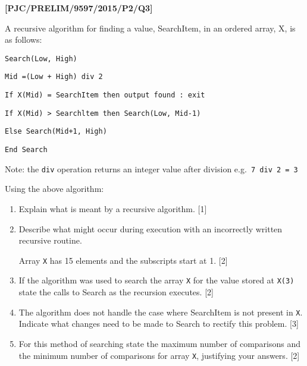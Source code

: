\item \textbf{{[}PJC/PRELIM/9597/2015/P2/Q3{]} }

A recursive algorithm for finding a value, SearchItem, in an ordered
array, X, is as follows: 

\noindent %
\noindent\begin{minipage}[t]{1\columnwidth}%
\texttt{Search(Low, High) }

\texttt{\qquad{}Mid =(Low + High) div 2 }

\texttt{\qquad{}If X(Mid) = SearchItem then output \textquotedbl found\textquotedbl{}
: exit }

\texttt{\qquad{}If X(Mid) > Searchltem then Search(Low, Mid-1) }

\texttt{\qquad{}\qquad{}Else Search(Mid+1, High) }

\texttt{End Search }

\texttt{\qquad{}}Note: the \texttt{div} operation returns an integer
value after division e.g.\texttt{ 7 div 2 = 3} %
\end{minipage}

Using the above algorithm: 
\begin{enumerate}
\item Explain what is meant by a recursive algorithm. \hfill{}{[}1{]}
\item Describe what might occur during execution with an incorrectly written
recursive routine. 

Array \texttt{X} has 15 elements and the subscripts start at 1. \hfill{}
{[}2{]}
\item If the algorithm was used to search the array \texttt{X} for the value
stored at \texttt{X(3)} state the calls to Search as the recursion
executes. \hfill{} {[}2{]}
\item The algorithm does not handle the case where SearchItem is not present
in \texttt{X}. Indicate what changes need to be made to Search to
rectify this problem. \hfill{}{[}3{]}
\item For this method of searching state the maximum number of comparisons
and the minimum number of comparisons for array \texttt{X}, justifying
your answers. \hfill{}{[}2{]}
\end{enumerate}